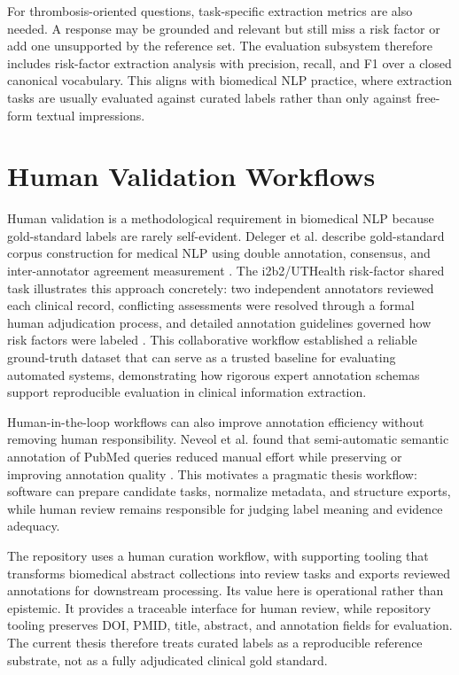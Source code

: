 For thrombosis-oriented questions, task-specific extraction metrics are also needed. A response may be grounded and relevant but still miss a risk factor or add one unsupported by the reference set. The evaluation subsystem therefore includes risk-factor extraction analysis with precision, recall, and F1 over a closed canonical vocabulary. This aligns with biomedical NLP practice, where extraction tasks are usually evaluated against curated labels rather than only against free-form textual impressions.

\section{Human Validation Workflows}

Human validation is a methodological requirement in biomedical NLP because gold-standard labels are rarely self-evident. Deleger et al. describe gold-standard corpus construction for medical NLP using double annotation, consensus, and inter-annotator agreement measurement \cite{deleger2012goldcorpora}. The i2b2/UTHealth risk-factor shared task illustrates this approach concretely: two independent annotators reviewed each clinical record, conflicting assessments were resolved through a formal human adjudication process, and detailed annotation guidelines governed how risk factors were labeled \cite{stubbs2015i2b2risk,stubbs2015riskannotation}. This collaborative workflow established a reliable ground-truth dataset that can serve as a trusted baseline for evaluating automated systems, demonstrating how rigorous expert annotation schemas support reproducible evaluation in clinical information extraction.

Human-in-the-loop workflows can also improve annotation efficiency without removing human responsibility. Neveol et al. found that semi-automatic semantic annotation of PubMed queries reduced manual effort while preserving or improving annotation quality \cite{neveol2011semiannotation}. This motivates a pragmatic thesis workflow: software can prepare candidate tasks, normalize metadata, and structure exports, while human review remains responsible for judging label meaning and evidence adequacy.

The repository uses a human curation workflow, with supporting tooling that transforms biomedical abstract collections into review tasks and exports reviewed annotations for downstream processing. Its value here is operational rather than epistemic. It provides a traceable interface for human review, while repository tooling preserves DOI, PMID, title, abstract, and annotation fields for evaluation. The current thesis therefore treats curated labels as a reproducible reference substrate, not as a fully adjudicated clinical gold standard.

